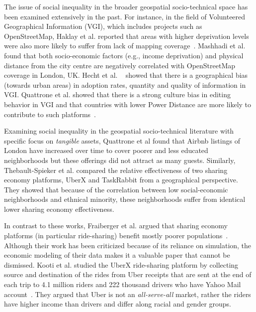 The issue of social inequality in the broader geospatial socio-technical space has been examined extensively in the past.  For instance, in the field of Volunteered Geographical Information (VGI), which includes projects such as OpenStreetMap, Haklay et al. reported that areas with higher deprivation levels were also more likely to suffer from lack of mapping coverage~\cite{haklay2010good}.   Mashhadi et al.\cite{mashhadi2013putting} found that both socio-economic factors (e.g., income deprivation) and physical distance from the city centre are negatively correlated with OpenStreetMap coverage in London, UK.   Hecht et al. ~\cite{hecht2014tale} showed that there is a geographical bias (towards urban areas) in adoption rates, quantity and quality of information in VGI.  Quattrone et al. showed that there is a strong culture bias in editing behavior in VGI and that countries with lower Power Distance are more likely to contribute to such platforms~\cite{quattrone2015there,quattrone2014mind}. 
	
 
Examining social inequality in the geospatial socio-technical literature with specific focus on \emph{tangible} assets, Quattrone et al \cite{quattrone16} found that Airbnb listings of London have increased over time to cover poorer and less educated neighborhoods but these offerings did not attract as many guests. Similarly, Thebault-Spieker et al. \cite{Thebault-Spieker17} compared the relative effectiveness of two sharing economy platforms, UberX and TaskRabbit from a geographical perspective. They showed that because of the correlation between low social-economic neighborhoods and ethnical minority, these neighborhoods suffer from identical lower sharing economy effectiveness. 

In contrast to these works, Fraiberger et al. argued that sharing economy platforms (in particular ride-sharing) benefit mostly poorer populations~\cite{fraiberger2015peer}. Although their work has been criticized because of its reliance on simulation, the economic modeling of their data makes it a valuable paper that cannot be dismissed. Kooti et al. studied the UberX ride-sharing platform by collecting source and destination of the rides from Uber receipts that are sent at the end of each trip to 4.1 million riders and 222 thousand drivers who have Yahoo Mail account~\cite{kooti2017analyzing}. They argued that Uber is not an \emph{all-serve-all} market, rather the riders have higher income than drivers and differ along racial and gender groups.


